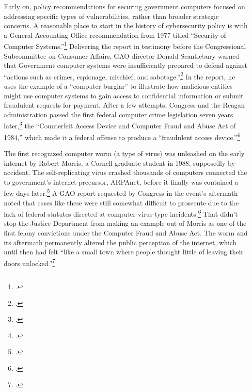 \documentclass[12pt]{article}
\begin{document}
Early on, policy recommendations for securing government computers focused on addressing specific types of vulnerabilities, rather than broader strategic concerns. A reasonable place to start in the history of cybersecurity policy is with a General Accounting Office recommendation from 1977 titled ``Security of Computer Systems.''\footcite{washington_post_staff_timeline_2003} Delivering the report in testimony before the Congressional Subcommittee on Consumer Affairs, GAO director Donald Scantlebury warned that Government computer systems were insufficiently prepared to defend against ``actions such as crimes, espionage, mischief, and sabotage.''\footcite{u.s._government_accounting_office_security_1977} In the report, he uses the example of a ``computer burglar'' to illustrate how malicious entities might use computer systems to gain access to confidential information or submit fraudulent requests for payment. After a few attempts, Congress and the Reagan administration passed the first federal computer crime legislation seven years later,\footcite[This later bill, the Computer Security Act of 1987, describes the 1984 bill as being the first federal legislation in this area.]{glickman_computer_1988} the ``Counterfeit Access Device and Computer Fraud and Abuse Act of 1984,'' which made it a federal offense to produce a ``fraudulent access device.''\footcite{hughes_access_1984}

The first recognized computer worm (a type of virus) was unleashed on the early internet by Robert Morris, a Cornell graduate student in 1988, supposedly by accident. The self-replicating virus crashed thousands of computers connected the to government's internet precursor, ARPAnet, before it finally was  contained a few days later.\footcite[This source, a master's thesis for the USAF Air University, makes the dramatic and completely unsubstantiated claim that the Morris worm infected half of of ARPAnet's 88,000 computers. The more popular (and plausible) claim is that of the roughly 60,000 ARPAnet-connected computers, the worm infected 10\% of them, though that number is not particularly well substantiated either.]{moore_conception_2014} A GAO report requested by Congress in the event's aftermath noted that cases like these were still somewhat difficult to prosecute due to the lack of federal statutes directed at computer-virus-type incidents.\footcite{u._s._government_accounting_office_computer_1989} That didn't stop the Justice Department from making an example out of Morris as one of the first felony convictions under the Computer Fraud and Abuse Act. The worm and its aftermath permanently altered the public perception of the internet, which until then had felt ``like a small town where people thought little of leaving their doors unlocked.''\footcite{lee_how_2013}
\end{document}
